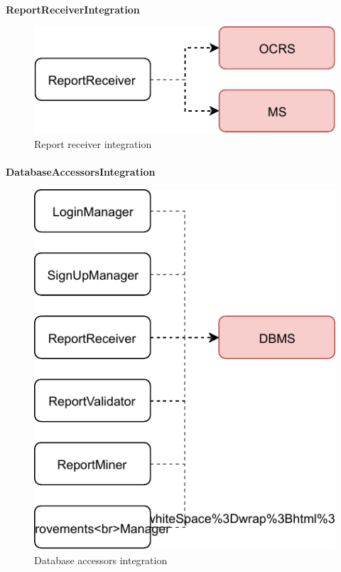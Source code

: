 			\paragraph{}
				\textbf{ReportReceiverIntegration}
					\begin{figure}
						\centering
						\includegraphics[width=\textwidth]{images/Integration/ReportReceiverIntegration.pdf}
						\caption{Report receiver integration}
					\end{figure}
			\paragraph{}
				\textbf{DatabaseAccessorsIntegration}
					\begin{figure}
						\centering
						\includegraphics[width=\textwidth]{images/Integration/DatabaseAccessorsIntegration.pdf}
						\caption{Database accessors integration}
					\end{figure}
